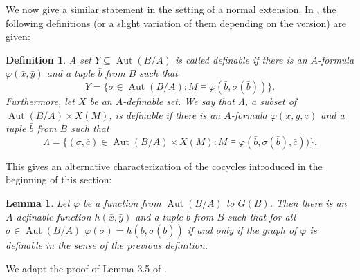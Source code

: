 \documentclass{article}
\theoremstyle{problemstyle}
\newtheorem{definition}[problem]{Definition}
\newtheorem{lemma}[problem]{Lemma}
\DeclareMathOperator{\aut}{Aut} %
\begin{document}
We now give a similar statement in the setting of a normal extension.  In \cite{pillay2024automorphism}, the following definitions (or a slight variation of them depending on the version) are given: 

\begin{definition}
    A set $Y \subseteq \aut(B/A)$ is called definable if there is an $A$-formula $\varphi(\bar{x},\bar{y})$ and a tuple $\bar{b}$ from $B$ such that $$Y = \{\sigma \in \aut(B/A) :  M \models \varphi(\bar{b},\sigma(\bar{b}))\}.$$ Furthermore, let $X$ be an $A$-definable set. We say that $\Lambda$, a subset of $\aut(B/A)\times X(M)$, is definable if there is an $A$-formula $\varphi(\bar{x},\bar{y},\bar{z})$ and a tuple $\bar{b}$ from $B$ such that $$\Lambda = \{(\sigma,\bar{c}) \in \aut(B/A)\times X(M) : M \models \varphi(\bar{b},\sigma(\bar{b}),\bar{c}))\}.$$
\end{definition}

This gives an alternative characterization of the cocycles introduced in the beginning of this section:

\begin{lemma}
    Let $\varphi$ be a function from $\aut(B/A)$ to $G(B)$.  Then there is an $A$-definable function $h(\bar{x},\bar{y})$ and a tuple $\bar{b}$ from $B$ such that for all $\sigma \in \aut(B/A)$ $\varphi(\sigma) = h(\bar{b},\sigma(\bar{b}))$ if and only if the graph of $\varphi$ is definable in the sense of the previous definition.
\end{lemma}

We adapt the proof of Lemma 3.5 of \cite{pillay2024automorphism}.
\end{document}
